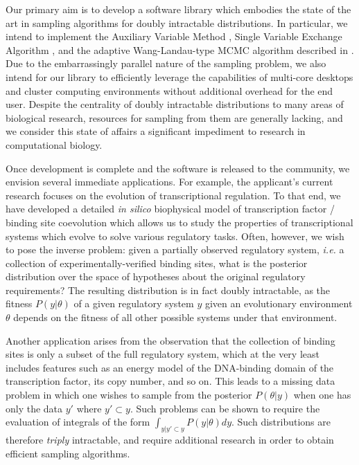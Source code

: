 \documentclass{article}
\begin{document}
Our primary aim is to develop a software library which embodies the
state of the art in sampling algorithms for doubly intractable
distributions.  In particular, we intend to implement the Auxiliary
Variable Method \cite{moller06}, Single Variable Exchange Algorithm
\cite{murray06}, and the adaptive Wang-Landau-type MCMC algorithm
described in \cite{atchade08}.  Due to the embarrassingly parallel
nature of the sampling problem, we also intend for our library to
efficiently leverage the capabilities of multi-core desktops and
cluster computing environments without additional overhead for the end
user.  Despite the centrality of doubly intractable distributions to
many areas of biological research, resources for sampling from them
are generally lacking, and we consider this state of affairs a
significant impediment to research in computational biology.  

Once development is complete and the software is released to the
community, we envision several immediate applications.  For example,
the applicant's current research focuses on the evolution of
transcriptional regulation.  To that end, we have developed a detailed
\textit{in silico} biophysical model of transcription factor / binding
site coevolution which allows us to study the properties of
transcriptional systems which evolve to solve various regulatory
tasks.  Often, however, we wish to pose the inverse problem: given a
partially observed regulatory system, \textit{i.e.} a collection of
experimentally-verified binding sites, what is the posterior
distribution over the space of hypotheses about the original
regulatory requirements?  The resulting distribution is in fact doubly
intractable, as the fitness $P(y|\theta)$ of a given regulatory system
$y$ given an evolutionary environment $\theta$ depends on the fitness of
all other possible systems under that environment.  

Another application arises from the observation that the collection of
binding sites is only a subset of the full regulatory system, which at
the very least includes features such as an energy model of the
DNA-binding domain of the transcription factor, its copy number, and
so on.  This leads to a missing data problem in which one wishes to
sample from the posterior $P(\theta|y)$ when one has only the data
$y'$ where $y'\subset y$.  Such problems can be shown to require the
evaluation of integrals of the form $\int_{y|y'\subset
  y}P(y|\theta)dy$.  Such distributions are therefore \textit{triply}
intractable, and require additional research in order to obtain
efficient sampling algorithms.
\end{document}
